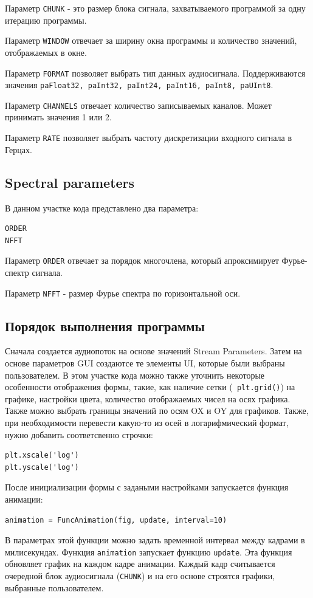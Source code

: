 Параметр \verb|CHUNK| - это размер блока сигнала, захватываемого программой за одну итерацию программы. 

Параметр \verb|WINDOW| отвечает за ширину окна программы и количество значений, отображаемых в окне.

Параметр \verb|FORMAT| позволяет выбрать тип данных аудиосигнала. Поддерживаются значения  \verb|paFloat32, paInt32, paInt24, paInt16, paInt8, paUInt8|.

Параметр \verb|CHANNELS| отвечает количество записываемых каналов. Может принимать значения 1 или 2. 

Параметр \verb|RATE| позволяет выбрать частоту дискретизации входного сигнала в Герцах.

\subsection{Spectral parameters}
В данном участке кода представлено два параметра:
\begin{verbatim}
ORDER
NFFT
\end{verbatim}
Параметр \verb|ORDER| отвечает за порядок многочлена, который апроксимирует Фурье-спектр сигнала.

Параметр \verb|NFFT| - размер Фурье спектра по горизонтальной оси.
\subsection{Порядок выполнения программы}
Сначала создается аудиопоток на основе значений Stream Parameters. Затем на основе параметров GUI создаютсе те элементы UI, которые были выбраны пользователем. В этом участке кода можно также уточнить некоторые особенности отображения формы, такие, как наличие сетки (\verb| plt.grid()|) на графике, настройки цвета, количество отображаемых чисел на осях графика. Также можно выбрать границы значений по осям OX и OY для графиков. Также, при необходимости перевести какую-то из осей в логарифмический формат, нужно добавить  соответсвенно строчки:
\begin{verbatim}
plt.xscale('log')
plt.yscale('log')
\end{verbatim}

После инициализации формы с задаными настройками запускается функция анимации: 
\begin{verbatim}
animation = FuncAnimation(fig, update, interval=10)
\end{verbatim}
В параметрах этой функции можно задать временной интервал между кадрами в милисекундах. Функция \verb|animation| запускает функцию \verb|update|. Эта функция обновляет график на каждом кадре анимации. Каждый кадр считывается очередной блок аудиосигнала (\verb|CHUNK|) и на его основе строятся графики, выбранные пользователем. 

